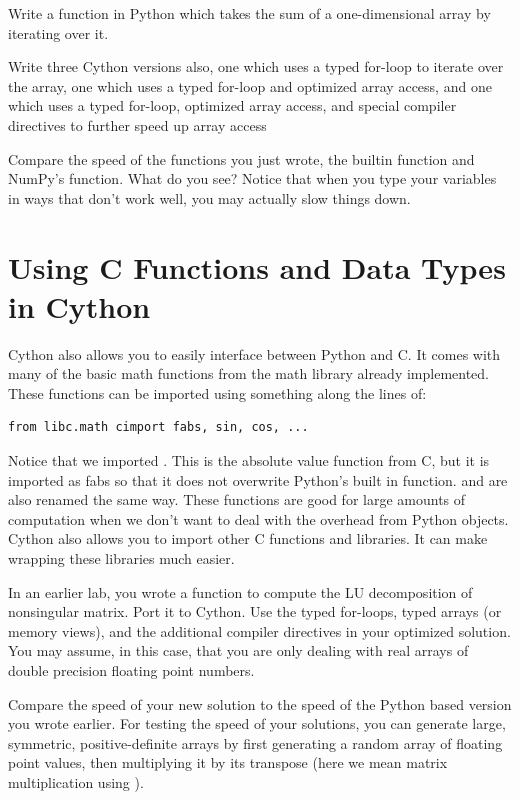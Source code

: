 \begin{problem}
Write a function in Python which takes the sum of a one-dimensional array by iterating over it.

Write three Cython versions also, one which uses a typed for-loop to iterate over the array, one which uses a typed for-loop and optimized array access, and one which uses a typed for-loop, optimized array access, and special compiler directives to further speed up array access

Compare the speed of the functions you just wrote, the builtin  function and NumPy's  function.
What do you see?
Notice that when you type your variables in ways that don't work well, you may actually slow things down.
\end{problem}

\section*{Using C Functions and Data Types in Cython}
Cython also allows you to easily interface between Python and C.
It comes with many of the basic math functions from the math library already implemented.
These functions can be imported using something along the lines of:
\begin{lstlisting}
from libc.math cimport fabs, sin, cos, ...
\end{lstlisting}
Notice that we imported .
This is the absolute value function from C, but it is imported as fabs so that it does not overwrite Python's built in  function. 
 and  are also renamed the same way.
These functions are good for large amounts of computation when we don't want to deal with the overhead from Python objects.
Cython also allows you to import other C functions and libraries.
It can make wrapping these libraries much easier.

\begin{problem}
In an earlier lab, you wrote a function to compute the LU decomposition of nonsingular matrix.
Port it to Cython.
Use the typed for-loops, typed arrays (or memory views), and the additional compiler directives in your optimized solution.
You may assume, in this case, that you are only dealing with real arrays of double precision floating point numbers.

Compare the speed of your new solution to the speed of the Python based version you wrote earlier.
For testing the speed of your solutions, you can generate large, symmetric, positive-definite arrays by first generating a random array of floating point values, then multiplying it by its transpose (here we mean matrix multiplication using ).
\end{problem}

